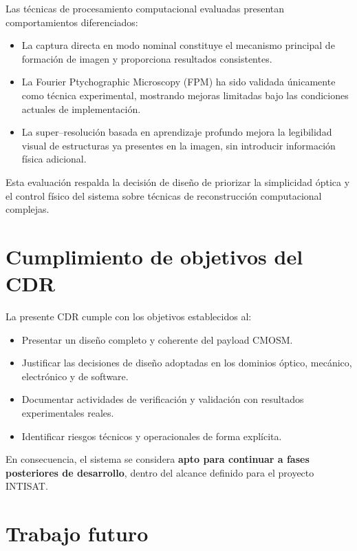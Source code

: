 Las técnicas de procesamiento computacional evaluadas presentan comportamientos
diferenciados:

\begin{itemize}
    \item La captura directa en modo nominal constituye el mecanismo principal de
    formación de imagen y proporciona resultados consistentes.
    \item La Fourier Ptychographic Microscopy (FPM) ha sido validada únicamente
    como técnica experimental, mostrando mejoras limitadas bajo las condiciones
    actuales de implementación.
    \item La super--resolución basada en aprendizaje profundo mejora la
    legibilidad visual de estructuras ya presentes en la imagen, sin introducir
    información física adicional.
\end{itemize}

Esta evaluación respalda la decisión de diseño de priorizar la simplicidad
óptica y el control físico del sistema sobre técnicas de reconstrucción
computacional complejas.

\section{Cumplimiento de objetivos del CDR}

La presente CDR cumple con los objetivos establecidos al:

\begin{itemize}
    \item Presentar un diseño completo y coherente del payload CMOSM.
    \item Justificar las decisiones de diseño adoptadas en los dominios óptico,
    mecánico, electrónico y de software.
    \item Documentar actividades de verificación y validación con resultados
    experimentales reales.
    \item Identificar riesgos técnicos y operacionales de forma explícita.
\end{itemize}

En consecuencia, el sistema se considera \textbf{apto para continuar a fases
posteriores de desarrollo}, dentro del alcance definido para el proyecto
INTISAT.

\section{Trabajo futuro}

